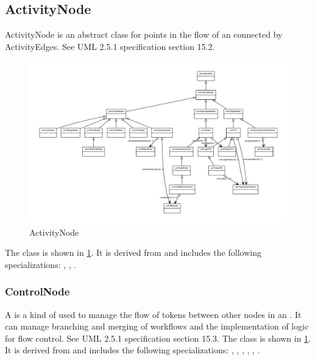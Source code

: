\subsection{ActivityNode}%
\label{sec:uml:ActivityNode}%
ActivityNode is an abstract class for points in the flow of an  connected by ActivityEdges. See UML 2.5.1 specification section 15.2.%
\newline%
\linebreak%


\begin{figure}[h!]%
\centering%
\includegraphics[width=1.0\textwidth]{uml_classes/ActivityNode_abstraction_hierarchy.pdf}%
\caption{ActivityNode}%
\label{fig:ActivityNode}%
\end{figure}

%
The  class is shown in \ref{fig:ActivityNode}. It is derived from  and includes the following specializations: , , . %
%
\subsubsection{ControlNode}%
\label{sec:uml:ControlNode}%
A  is a kind of  used to manage the flow of tokens between other nodes in an . It can manage branching and merging of workflows and the implementation of logic for flow control. See UML 2.5.1 specification section 15.3.%
\newline%
\linebreak%
The  class is shown in \ref{fig:ActivityNode}. It is derived from  and includes the following specializations: , , , , , . %
%
